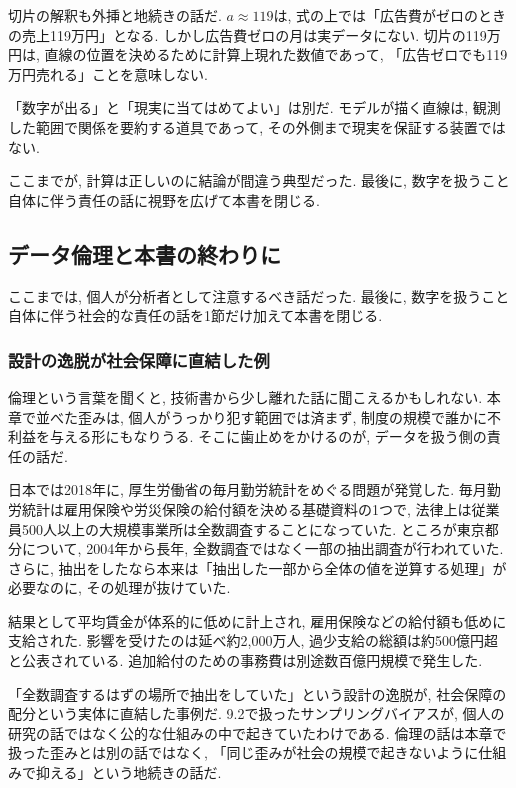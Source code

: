 切片の解釈も外挿と地続きの話だ.
$a \approx 119$は, 式の上では「広告費がゼロのときの売上119万円」となる.
しかし広告費ゼロの月は実データにない.
切片の119万円は, 直線の位置を決めるために計算上現れた数値であって, 「広告ゼロでも119万円売れる」ことを意味しない.

「数字が出る」と「現実に当てはめてよい」は別だ.
モデルが描く直線は, 観測した範囲で関係を要約する道具であって, その外側まで現実を保証する装置ではない.

ここまでが, 計算は正しいのに結論が間違う典型だった.
最後に, 数字を扱うこと自体に伴う責任の話に視野を広げて本書を閉じる.


\subsection{データ倫理と本書の終わりに}

ここまでは, 個人が分析者として注意するべき話だった.
最後に, 数字を扱うこと自体に伴う社会的な責任の話を1節だけ加えて本書を閉じる.

\subsubsection*{設計の逸脱が社会保障に直結した例}

倫理という言葉を聞くと, 技術書から少し離れた話に聞こえるかもしれない.
本章で並べた歪みは, 個人がうっかり犯す範囲では済まず, 制度の規模で誰かに不利益を与える形にもなりうる.
そこに歯止めをかけるのが, データを扱う側の責任の話だ.

日本では2018年に, 厚生労働省の毎月勤労統計をめぐる問題が発覚した.
毎月勤労統計は雇用保険や労災保険の給付額を決める基礎資料の1つで, 法律上は従業員500人以上の大規模事業所は全数調査することになっていた.
ところが東京都分について, 2004年から長年, 全数調査ではなく一部の抽出調査が行われていた.
さらに, 抽出をしたなら本来は「抽出した一部から全体の値を逆算する処理」が必要なのに, その処理が抜けていた.

結果として平均賃金が体系的に低めに計上され, 雇用保険などの給付額も低めに支給された.
影響を受けたのは延べ約2{,}000万人, 過少支給の総額は約500億円超と公表されている.
追加給付のための事務費は別途数百億円規模で発生した.

「全数調査するはずの場所で抽出をしていた」という設計の逸脱が, 社会保障の配分という実体に直結した事例だ.
9.2で扱ったサンプリングバイアスが, 個人の研究の話ではなく公的な仕組みの中で起きていたわけである.
倫理の話は本章で扱った歪みとは別の話ではなく, 「同じ歪みが社会の規模で起きないように仕組みで抑える」という地続きの話だ.

